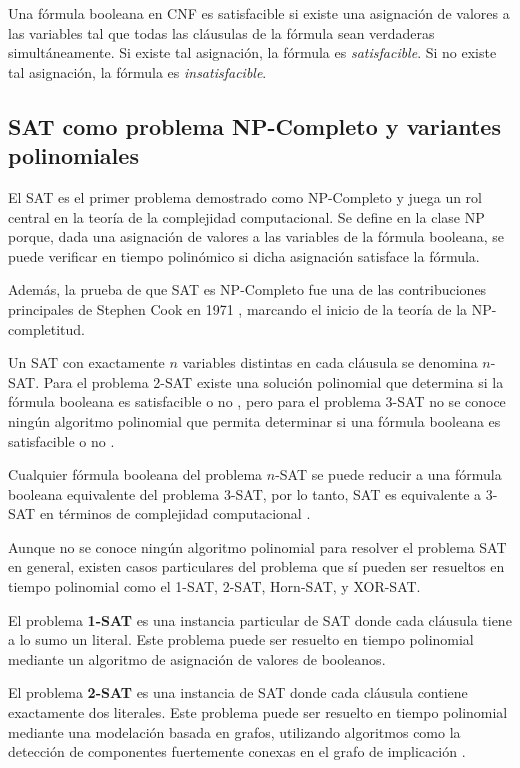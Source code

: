 \documentclass[12pt]{article}
\begin{document}
Una fórmula booleana en CNF es satisfacible si existe una asignación de valores a las variables tal que todas las cláusulas de la fórmula sean verdaderas simultáneamente.
Si existe tal asignación, la fórmula es \textit{satisfacible}. Si no existe tal asignación, la fórmula es \textit{insatisfacible}.

\subsection{SAT como problema NP-Completo y variantes polinomiales}

El SAT es el primer problema demostrado como NP-Completo \cite{authomataTheory} y juega un rol central en la teoría de la complejidad computacional. Se define en la clase NP porque, dada una asignación de valores a las variables de la fórmula booleana, se puede verificar en tiempo polinómico si dicha asignación satisface la fórmula.

Además, la prueba de que SAT es NP-Completo fue una de las contribuciones principales de Stephen Cook en 1971 \cite{authomataTheory}, marcando el inicio de la teoría de la NP-completitud.

Un SAT con exactamente $n$ variables distintas en cada cláusula se denomina $n$-SAT. Para el problema 2-SAT existe una solución polinomial que determina si la fórmula booleana es satisfacible o no \cite{2satbib}, pero para el problema 3-SAT no se conoce ningún algoritmo polinomial que permita
determinar si una fórmula booleana es satisfacible o no \cite{authomataTheory}.

Cualquier fórmula booleana del problema $n$-SAT se puede reducir a una fórmula booleana equivalente del problema 3-SAT, 
por lo tanto, SAT es equivalente a 3-SAT en términos de complejidad computacional \cite{authomataTheory}.

Aunque no se conoce ningún algoritmo polinomial para resolver el problema SAT en general,
existen casos particulares del problema que sí pueden ser resueltos en tiempo polinomial como el 1-SAT, 2-SAT, Horn-SAT, y XOR-SAT.

El problema \textbf{1-SAT} es una instancia particular de SAT donde cada cláusula tiene a lo sumo un literal.
Este problema puede ser resuelto en tiempo polinomial mediante un algoritmo de asignación de valores de booleanos.

El problema \textbf{2-SAT} es una instancia de SAT donde cada cláusula contiene exactamente dos literales.  Este problema puede ser resuelto en tiempo polinomial mediante una modelación basada en grafos, utilizando algoritmos como la detección de componentes fuertemente conexas en el grafo de implicación \cite{2satbib}.
\end{document}
